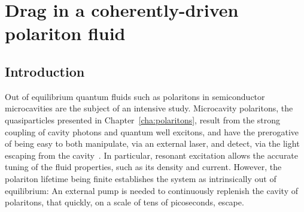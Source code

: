 

\chapter{Drag in a coherently-driven polariton fluid}
\label{cha:drag}

\section{Introduction}
\label{sec:intro}

Out of equilibrium quantum fluids such as polaritons in semiconductor
microcavities are the subject of an intensive study. Microcavity
polaritons, the quasiparticles presented in
Chapter~\ref{cha:polaritons}, result from the strong coupling of
cavity photons and quantum well excitons, and have the prerogative of
being easy to both manipulate, via an external laser, and detect, via
the light escaping from the cavity~\cite{9780199228942}. In
particular, resonant excitation allows the accurate tuning of the
fluid properties, such as its density and current. However, the
polariton lifetime being finite establishes the system as
intrinsically out of equilibrium: An external pump is needed to
continuously replenish the cavity of polaritons, that quickly, on a
scale of tens of picoseconds, escape.

